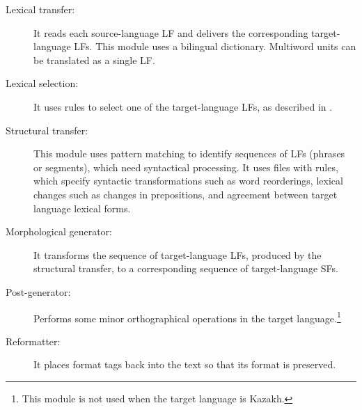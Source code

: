\documentclass[11pt]{article}
\begin{document}
\begin{description}
\item[Lexical transfer:] It reads each source-language LF and delivers the corresponding target-language 
  LFs. This module uses a bilingual dictionary. 
 Multiword units can be translated as a single LF.
\item[ Lexical selection:] It uses rules to select one of the target-language LFs, as described in \cite{tyers12a}.
\item [Structural transfer:] This module uses pattern matching to identify sequences of LFs (phrases or 
  segments), which need syntactical processing.
It uses files with rules, which specify syntactic transformations such as word reorderings, 
  lexical changes such as changes in prepositions, and agreement between target language lexical forms. %
\item[Morphological generator:] It transforms the sequence of target-language LFs, produced by the structural transfer, 
  to a corresponding sequence of target-language SFs. 

\item[Post-generator:] Performs some minor orthographical operations in the target language.\footnote{This module is not used when the target language is Kazakh.} 
\item[ Reformatter:] It places format tags back into the text so that its format is preserved.
\end{description}
\end{document}
